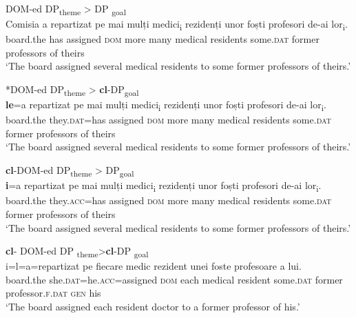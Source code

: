 \documentclass[output=paper,colorlinks,citecolor=brown,nonflat]{langsci/langscibook}
\begin{document}
\ea%
    \label{ex:cornilescu:3}
    DOM-ed DP\textsubscript{theme} > DP \textsubscript{goal}\\
    \gll Comisia {a} {repartizat} {pe} {mai} {mulți} {medici\textsubscript{i}} {rezidenți} {unor} {foști} {profesori} {de-ai} {lor\textsubscript{i}}.\\
        board.the has assigned \textsc{dom} more many medical residents some.\textsc{dat} former professors of theirs\\
    \glt ‘The board assigned several medical residents to some former professors of theirs.’
    \z



\ea%
    \label{ex:cornilescu:4}
    *DOM-ed DP\textsubscript{theme} > \textbf{cl}-DP\textsubscript{goal}\\
     \textbf{{le}}{=a} {repartizat} {pe} {mai} {mulți} {medici\textsubscript{i}} {rezidenți} {unor} {foști} {profesori} {de-ai} {lor\textsubscript{i}}.\\
        board.the  they.\textsc{dat}=has assigned  \textsc{dom} more many medical residents some.\textsc{dat} former professors of theirs\\
    \glt ‘The board assigned several medical residents to some former professors of theirs.’
    \z



\ea%
    \label{ex:cornilescu:5}
    \textbf{cl}-DOM-ed DP\textsubscript{theme} > DP\textsubscript{goal}\\
     \textbf{{i}}{=a} {repartizat} {pe} {mai} mulți {medici\textsubscript{i}} {rezidenți} {unor} {foști} {profesori} {de-ai} {lor\textsubscript{i}}.\\
		board.the they.\textsc{acc=}has assigned \textsc{dom} more many medical residents some.\textsc{dat} former professors of theirs\\
    \glt ‘The board assigned several medical residents to some former professors of theirs.’
    \z




\ea%
    \label{ex:cornilescu:6}
    \textbf{cl}- DOM-ed DP \textsubscript{theme}>\textbf{cl}{}-DP \textsubscript{goal} \\
     {i=l=a=repartizat} {pe} {fiecare} {medic} {rezident} {unei} {foste} {profesoare} {a} {lui}.\\
       board.the she.\textsc{dat}=he.\textsc{acc}=assigned \textsc{dom} each medical resident some.\textsc{dat} former professor.\textsc{f}.\textsc{dat} \textsc{gen} his\\
    \glt ‘The board assigned each resident doctor to a former professor of his.’
    \z
\end{document}
